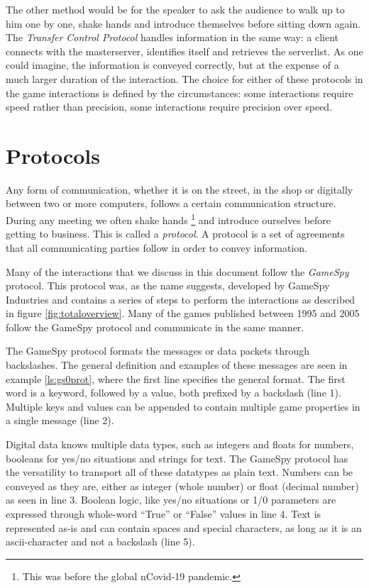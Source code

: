 The other method would be for the speaker to ask the audience to walk up to him one by one, shake hands and introduce themselves before sitting down again. The \emph{Transfer Control Protocol}  handles information in the same way: a client connects with the masterserver, identifies itself and retrieves the serverlist. As one could imagine, the information is conveyed correctly, but at the expense of a much larger duration of the interaction. The choice for either of these protocols in the game interactions is defined by the circumstances: some interactions require speed rather than precision, some interactions require precision over speed.

\section{Protocols}
Any form of communication, whether it is on the street, in the shop or digitally between two or more computers, follows a certain communication structure. During any meeting we often shake hands \footnote{This was before the global nCovid-19 pandemic.} and introduce ourselves before getting to business. This is called a \emph{protocol}. A protocol is a set of agreements that all communicating parties follow in order to convey information.

Many of the interactions that we discuss in this document follow the \emph{GameSpy} protocol. This protocol was, as the name suggests, developed by GameSpy Industries\cite{gs0} and contains a series of steps to perform the interactions as described in figure \ref{fig:totaloverview}. Many of the games published between 1995 and 2005 follow the GameSpy protocol and communicate in the same manner.

The GameSpy protocol formats the messages or data packets through backslashes. The general definition and examples of these messages are seen in example \ref{ls:gs0prot}, where the first line specifies the general format. The first word is a keyword, followed by a value, both prefixed by a backslash (line 1). Multiple keys and values can be appended to contain multiple game properties in a single message (line 2).



Digital data knows multiple data types, such as integers and floats for numbers, booleans for yes/no situations and strings for text. The GameSpy protocol has the versatility to transport all of these datatypes as plain text. Numbers can be conveyed as they are, either as integer (whole number) or float (decimal number) as seen in line 3. Boolean logic, like yes/no situations or 1/0 parameters are expressed through whole-word ``True'' or ``False'' values in line 4. Text is represented as-is and can contain spaces and special characters, as long as it is an ascii-character and not a backslash (line 5). 

